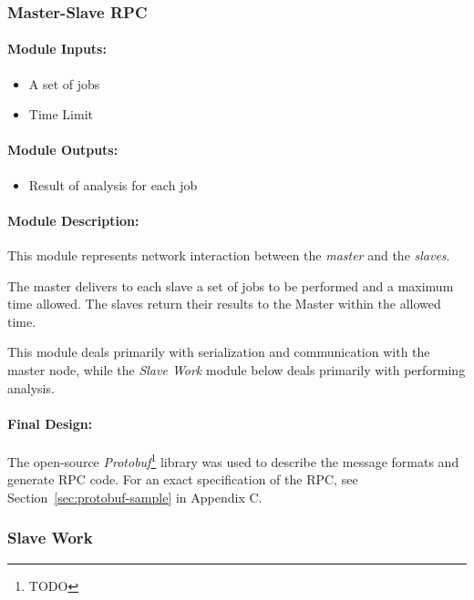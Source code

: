 \documentclass[pdftex,12pt,a4paper]{article}
\begin{document}
\subsubsection{Master-Slave RPC}

\paragraph{Module Inputs:}
\begin{itemize}
\item A set of jobs
\item Time Limit
\end{itemize}

\paragraph{Module Outputs:}
\begin{itemize}
\item Result of analysis for each job
\end{itemize}

\paragraph{Module Description:\\}
This module represents network interaction between the \emph{master} and the \emph{slaves}.

The master delivers to each slave a set of jobs to be performed and a maximum time allowed. The slaves return their results to the Master within the allowed time.

This module deals primarily with serialization and communication with the master node, while the \emph{Slave Work} module below deals primarily with performing analysis.

\paragraph{Final Design:\\}
The open-source \emph{Protobuf}\footnote{TODO} library was used to describe the message formats and generate RPC code. For an exact specification of the RPC, see Section~\ref{sec:protobuf-sample} in Appendix C.



\subsubsection{Slave Work}
\end{document}
